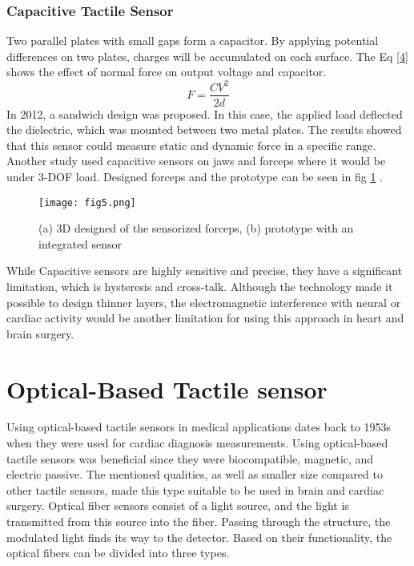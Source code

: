 \documentclass[conference]{IEEEtran}
\begin{document}
\subsubsection{Capacitive Tactile Sensor}
Two parallel plates with small gaps form a capacitor. By applying potential differences on two plates, charges will be accumulated on each surface. The Eq \ref{4} shows the effect of normal force on output voltage and capacitor.
\begin{equation}
	F=\frac{CV^2}{2d} 	
	\label{4}
\end{equation}
In 2012, a sandwich design was proposed. In this case, the applied load deflected the dielectric, which was mounted between two metal plates. The results showed that this sensor could measure static and dynamic force in a specific range. Another study used capacitive sensors on jaws and forceps where it would be under 3-DOF load. Designed forceps and the prototype can be seen in fig \ref{fig2} .\\
\begin{figure}[b]
	\centerline{\texttt{[image: fig5.png]}}
	\caption{(a) 3D designed of the sensorized forceps, (b) prototype with an integrated sensor}
	\label{fig2}
\end{figure}
While Capacitive sensors are highly sensitive and precise, they have a significant limitation, which is hysteresis and cross-talk. Although the technology made it possible to design thinner layers, the electromagnetic interference with neural or cardiac activity would be another limitation for using this approach in heart and brain surgery.  
\section{Optical-Based Tactile sensor}
Using optical-based tactile sensors in medical applications dates back to 1953s when they were used for cardiac diagnosis measurements. Using optical-based tactile sensors was beneficial since they were biocompatible, magnetic, and electric passive. The mentioned qualities, as well as smaller size compared to other tactile sensors, made this type suitable to be used in brain and cardiac surgery.
Optical fiber sensors consist of a light source, and the light is transmitted from this source into the fiber. Passing through the structure, the modulated light finds its way to the detector. Based on their functionality, the optical fibers can be divided into three types. 

\end{document}
